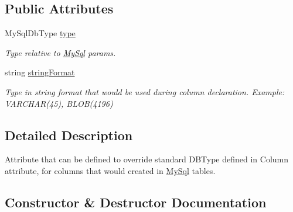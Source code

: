 \subsection*{Public Attributes}
\begin{DoxyCompactItemize}
\item 
My\+Sql\+Db\+Type \mbox{\hyperlink{class_uniform_data_operator_1_1_sql_1_1_my_sql_1_1_markup_1_1_my_sql_d_b_type_override_attribute_ab2a4ea0d332bbef5fcda9c1be1a568c9}{type}}
\begin{DoxyCompactList}\small\item\em Type relative to \mbox{\hyperlink{namespace_uniform_data_operator_1_1_sql_1_1_my_sql}{My\+Sql}} params. \end{DoxyCompactList}\item 
string \mbox{\hyperlink{class_uniform_data_operator_1_1_sql_1_1_my_sql_1_1_markup_1_1_my_sql_d_b_type_override_attribute_a7410daaecf6cc40b01fd9ed17c0d02aa}{string\+Format}}
\begin{DoxyCompactList}\small\item\em Type in string format that would be used during column declaration. Example\+: V\+A\+R\+C\+H\+A\+R(45), B\+L\+O\+B(4196) \end{DoxyCompactList}\end{DoxyCompactItemize}


\subsection{Detailed Description}
Attribute that can be defined to override standard D\+B\+Type defined in Column attribute, for columns that would created in \mbox{\hyperlink{namespace_uniform_data_operator_1_1_sql_1_1_my_sql}{My\+Sql}} tables. 



\subsection{Constructor \& Destructor Documentation}
\mbox{\label{class_uniform_data_operator_1_1_sql_1_1_my_sql_1_1_markup_1_1_my_sql_d_b_type_override_attribute_aa74bbebc2d24175c5789db6c59994150}} 
